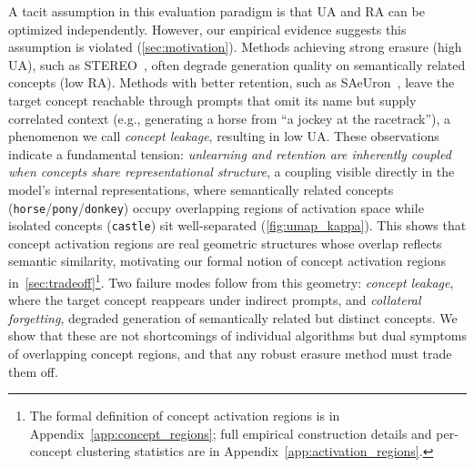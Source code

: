 A tacit assumption in this evaluation paradigm is that UA and RA can be optimized independently. However, our empirical evidence suggests this assumption is violated (\cref{sec:motivation}). Methods achieving strong erasure (high UA), such as STEREO~\citep{srivatsan2025stereo}, often degrade generation quality on semantically related concepts (low RA).
Methods with better retention, such as SAeUron~\citep{cywinski2025saeuron}, leave the target concept reachable through prompts that omit its name but supply correlated context (e.g., generating a horse from ``a jockey at the racetrack''), a phenomenon we call \emph{concept leakage}, resulting in low UA.
These observations indicate a fundamental tension: \emph{unlearning and retention are inherently coupled when concepts share representational structure}, a coupling visible directly in the model's internal representations, where semantically related concepts (\texttt{horse}/\texttt{pony}/\texttt{donkey}) occupy overlapping regions of activation space while isolated concepts (\texttt{castle}) sit well-separated (\cref{fig:umap_kappa}). 
This shows that concept activation regions are real geometric structures whose overlap reflects semantic similarity, motivating our formal notion of concept activation regions in~\cref{sec:tradeoff}\footnote{The formal definition of concept activation regions is in Appendix~\ref{app:concept_regions}; full empirical construction details and per-concept clustering statistics are in Appendix~\ref{app:activation_regions}.}.
Two failure modes follow from this geometry: \emph{concept leakage}, where the target concept reappears under indirect prompts, and \emph{collateral forgetting}, degraded generation of semantically related but distinct concepts. We show that these are not shortcomings of individual algorithms but dual symptoms of overlapping concept regions, and that any robust erasure method must trade them off.

